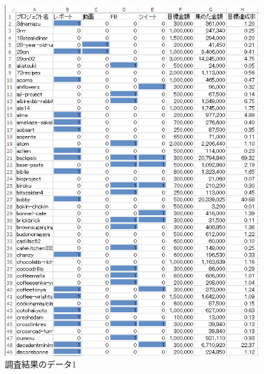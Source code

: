 \begin{figure}[H]
\centering
\includegraphics[width=16cm]{chousa6.PNG}
\caption{調査結果のデータ1}\label{サンプル図}
\end{figure}

